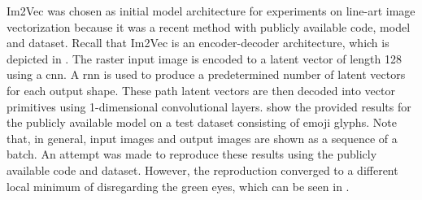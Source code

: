 Im2Vec \citep{DBLP:conf/cvpr/Reddy21} was chosen as initial model architecture for experiments on line-art image vectorization because it was a recent method with publicly available code, model and dataset. Recall that Im2Vec is an encoder-decoder architecture, which is depicted in . The raster input image is encoded to a latent vector of length 128 using a \gls{cnn}. A \gls{rnn} is used to produce a predetermined number of latent vectors for each output shape. These path latent vectors are then decoded into vector primitives using 1-dimensional convolutional layers.  show the provided results for the publicly available model on a test dataset consisting of emoji glyphs. Note that, in general, input images and output images are shown as a sequence of a batch. An attempt was made to reproduce these results using the publicly available code and dataset. However, the reproduction converged to a different local minimum of disregarding the green eyes, which can be seen in . 

